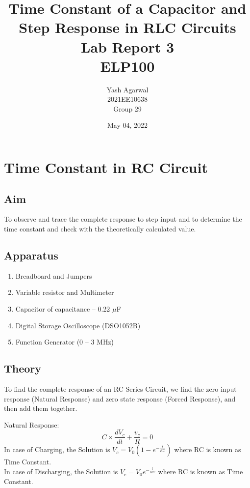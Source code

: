 \documentclass{article}
\title{Time Constant of a Capacitor and Step Response in RLC Circuits \\ Lab Report 3 \\ ELP100}
\author{Yash Agarwal \\ 2021EE10638 \\ Group 29}
\date{May 04, 2022}
\begin{document}
\pagecolor{yellow!15}
\maketitle
\vspace{15px}
\tableofcontents
{}
\newpage
\section{Time Constant in RC Circuit}
\subsection{Aim}
To observe and trace the complete response to step input and to determine the time constant and check with the theoretically calculated value. 
\subsection{Apparatus}
\begin{enumerate}
\item Breadboard and Jumpers
\item Variable resistor and Multimeter
\item Capacitor of capacitance – 0.22 $\mu$F
\item Digital Storage Oscilloscope (DSO1052B)
\item Function Generator (0 – 3 MHz)
\end{enumerate}

\subsection{Theory}

\begin{figure}
\end{figure}

To find the complete response of an RC Series Circuit, we find the zero input response (Natural Response) and zero state response (Forced Response), and then add them together.

\noindent
Natural Response: \[ C\times\frac{dV_c}{dt}+\frac{v_c}{R}=0\]
In case of Charging, the Solution is $V_c=V_0(1-e^{-\frac{t}{RC}})$ where RC is known as Time Constant.\\
\noindent
In case of Discharging, the Solution is $V_c=V_0e^{-\frac{t}{RC}}$ where RC is known as Time Constant.
\end{document}
